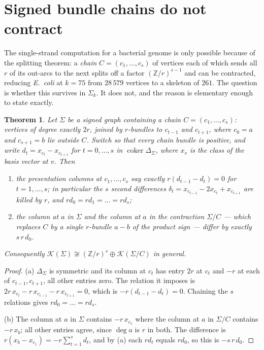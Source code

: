 \documentclass[11pt]{article}
\theoremstyle{plain}
\newtheorem{theorem}{Theorem}
\theoremstyle{definition}
\theoremstyle{remark}
\newcommand{\Z}{\mathbb{Z}}
\newcommand{\K}{\mathcal{K}}
\newcommand{\coker}{\operatorname{coker}}
\newcommand{\Sig}{\Sigma}
\begin{document}
\section{Signed bundle chains do not contract}\label{sec:series}

The single-strand computation for a bacterial genome is only possible because of the
splitting theorem: a \emph{chain} $C=(c_1,\dots,c_s)$ of vertices each of which sends all
$r$ of its out-arcs to the next splits off a factor $(\Z/r)^{s-1}$ and can be contracted,
reducing \emph{E.\ coli} at $k=75$ from $28\,579$ vertices to a skeleton of $261$. The
question is whether this survives in $\Sig_k$. It does not, and the reason is elementary
enough to state exactly.

\begin{theorem}\label{thm:series}
Let $\Sig$ be a signed graph containing a chain $C=(c_1,\dots,c_s)$: vertices of degree
exactly $2r$, joined by $r$-bundles to $c_{t-1}$ and $c_{t+1}$, where $c_0=a$ and
$c_{s+1}=b$ lie outside $C$. Switch so that every chain bundle is positive, and write
$d_t=x_{c_t}-x_{c_{t+1}}$ for $t=0,\dots,s$ in $\coker\Delta_\Sig$, where $x_v$ is the class
of the basis vector at $v$. Then
\begin{enumerate}
\item[\rm(a)] the presentation columns at $c_1,\dots,c_s$ say exactly
      $r(d_{t-1}-d_t)=0$ for $t=1,\dots,s$; in particular the $s$ second differences
      $\delta_t=x_{c_{t-1}}-2x_{c_t}+x_{c_{t+1}}$ are killed by $r$, and
      $r d_0=r d_1=\dots=r d_s$;
\item[\rm(b)] the column at $a$ in $\Sig$ and the column at $a$ in the contraction $\Sig/C$
      --- which replaces $C$ by a single $r$-bundle $a\!-\!b$ of the product sign --- differ
      by exactly $s\,r\,d_0$.
\end{enumerate}
Consequently $\K(\Sig)\not\cong(\Z/r)^s\oplus\K(\Sig/C)$ in general.
\end{theorem}

\begin{proof}
(a) $\Delta_\Sig$ is symmetric and its column at $c_t$ has entry $2r$ at $c_t$ and $-r$ at
each of $c_{t-1},c_{t+1}$, all other entries zero. The relation it imposes is
$2r\,x_{c_t}-r\,x_{c_{t-1}}-r\,x_{c_{t+1}}=0$, which is $-r(d_{t-1}-d_t)=0$. Chaining the
$s$ relations gives $r d_0=\dots=r d_s$.

(b) The column at $a$ in $\Sig$ contains $-r\,x_{c_1}$ where the column at $a$ in $\Sig/C$
contains $-r\,x_b$; all other entries agree, since $\deg a$ is $r$ in both. The difference is
$r(x_b-x_{c_1})=-r\sum_{t=1}^s d_t$, and by (a) each $r d_t$ equals $r d_0$, so this is
$-s\,r\,d_0$.
\end{proof}
\end{document}
